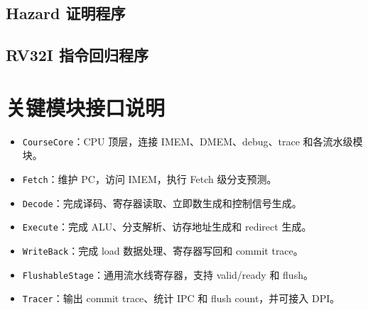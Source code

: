 \documentclass[UTF8,a4paper,12pt]{ctexrep}
\begin{document}
\section{Hazard 证明程序}
\label{app:hazard-asm}







\section{RV32I 指令回归程序}







\chapter{关键模块接口说明}

\begin{itemize}
  \item \texttt{CourseCore}：CPU 顶层，连接 IMEM、DMEM、debug、trace 和各流水级模块。
  \item \texttt{Fetch}：维护 PC，访问 IMEM，执行 Fetch 级分支预测。
  \item \texttt{Decode}：完成译码、寄存器读取、立即数生成和控制信号生成。
  \item \texttt{Execute}：完成 ALU、分支解析、访存地址生成和 redirect 生成。
  \item \texttt{WriteBack}：完成 load 数据处理、寄存器写回和 commit trace。
  \item \texttt{FlushableStage}：通用流水线寄存器，支持 valid/ready 和 flush。
  \item \texttt{Tracer}：输出 commit trace、统计 IPC 和 flush count，并可接入 DPI。
\end{itemize}
\end{document}
